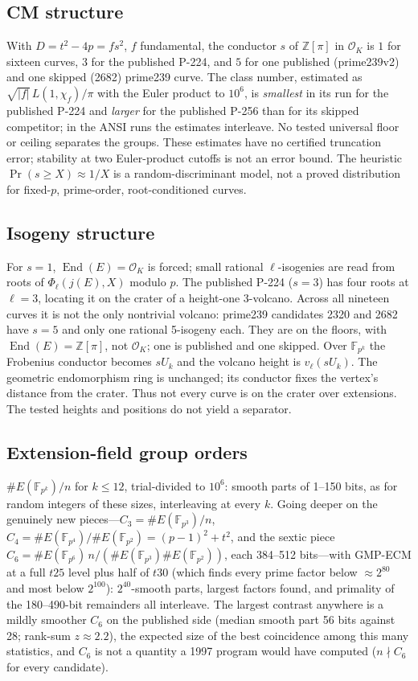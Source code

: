 \documentclass[11pt]{article}
\newcommand{\F}{\mathbb{F}}
\newcommand{\Z}{\mathbb{Z}}
\newcommand{\End}{\operatorname{End}}
\begin{document}
\subsection{CM structure}
With $D = t^2-4p = f s^2$, $f$ fundamental, the conductor $s$ of $\Z[\pi]$ in $\mathcal{O}_K$ is $1$ for sixteen curves, $3$ for the published P-224, and $5$ for one published (prime239v2) and one skipped (2682) prime239 curve. The class number, estimated as $\sqrt{|f|}\,L(1,\chi_f)/\pi$ with the Euler product to $10^6$, is \emph{smallest} in its run for the published P-224 and \emph{larger} for the published P-256 than for its skipped competitor; in the ANSI runs the estimates interleave. No tested universal floor or ceiling separates the groups. These estimates have no certified truncation error; stability at two Euler-product cutoffs is not an error bound. The heuristic $\Pr(s\ge X)\approx 1/X$ is a random-discriminant model, not a proved distribution for fixed-$p$, prime-order, root-conditioned curves.

\subsection{Isogeny structure}
For $s=1$, $\End(E)=\mathcal{O}_K$ is forced; small rational $\ell$-isogenies are read from roots of $\Phi_\ell(j(E),X)$ modulo $p$. The published P-224 ($s=3$) has four roots at $\ell=3$, locating it on the crater of a height-one 3-volcano. Across all nineteen curves it is not the only nontrivial volcano: prime239 candidates 2320 and 2682 have $s=5$ and only one rational 5-isogeny each. They are on the floors, with $\End(E)=\Z[\pi]$, not $\mathcal{O}_K$; one is published and one skipped. Over $\F_{p^k}$ the Frobenius conductor becomes $sU_k$ and the volcano height is $v_\ell(sU_k)$. The geometric endomorphism ring is unchanged; its conductor fixes the vertex's distance from the crater. Thus not every curve is on the crater over extensions. The tested heights and positions do not yield a separator.

\subsection{Extension-field group orders}
$\#E(\F_{p^k})/n$ for $k\le12$, trial-divided to $10^6$: smooth parts of 1--150 bits, as for random integers of these sizes, interleaving at every $k$. Going deeper on the genuinely new pieces---$C_3=\#E(\F_{p^3})/n$, $C_4=\#E(\F_{p^4})/\#E(\F_{p^2})=(p-1)^2+t^2$, and the sextic piece $C_6=\#E(\F_{p^6})\,n/(\#E(\F_{p^3})\#E(\F_{p^2}))$, each 384--512 bits---with GMP-ECM at a full $t25$ level plus half of $t30$ (which finds every prime factor below $\approx2^{80}$ and most below $2^{100}$): $2^{40}$-smooth parts, largest factors found, and primality of the 180--490-bit remainders all interleave. The largest contrast anywhere is a mildly smoother $C_6$ on the published side (median smooth part 56 bits against 28; rank-sum $z\approx2.2$), the expected size of the best coincidence among this many statistics, and $C_6$ is not a quantity a 1997 program would have computed ($n\nmid C_6$ for every candidate).
\end{document}
